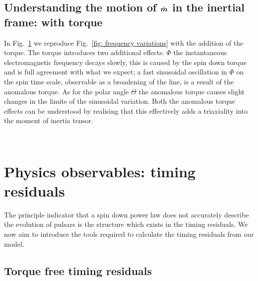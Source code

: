 \documentclass[../full_thesis/full_thesis.tex]{subfiles}
\begin{document}
\subsection{Understanding the motion of $\hat{\boldsymbol{m}}$ in the inertial frame: with torque}
In Fig.~\ref{fig: variations with torque} we reproduce Fig.~\ref{fig: frequency variations} with the addition of the torque. The torque introduces
two additional effects: $\dot{\Phi}$ the instantaneous electromagnetic
frequency decays slowly, this is caused by the spin down torque and is full
agreement with what we expect; a fast sinusoidal oscillation in $\dot{\Phi}$ on
the spin time scale, observable as a broadening of the line, is a result of the
anomalous torque. As for the polar angle $\Theta$ the anomalous torque causes
slight changes in the limits of the sinusoidal variation. Both the anomalous
torque effects can be understood by realising that this effectively adds a
triaxiality into the moment of inertia tensor. %

\begin{figure}[ht]
\centering
	 \\
\caption{}
\label{fig: variations with torque}
\end{figure}

\section{Physics observables: timing residuals}

The principle indicator that a spin down power law does not accurately describe
the evolution of pulsars is the structure which exists in the timing
residuals. We now aim to introduce the tools required to calculate the timing
residuals from our model.

\subsection{Torque free timing residuals}
\end{document}
